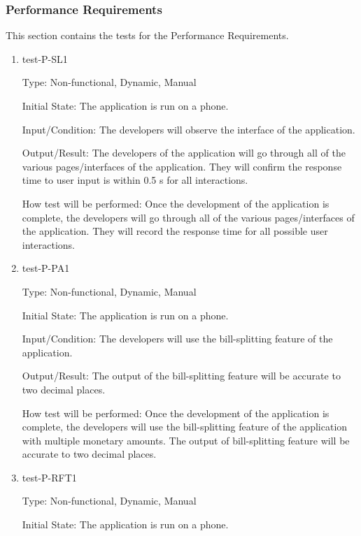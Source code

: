 \documentclass[12pt, titlepage]{article}
\begin{document}
\subsubsection{Performance Requirements}

This section contains the tests for the Performance Requirements.
		
\begin{enumerate}

\item{test-P-SL1\\}

Type: Non-functional, Dynamic, Manual 
					
Initial State: The application is run on a phone.
					
Input/Condition: The developers will observe the interface of the application. 
					
Output/Result: The developers of the application will go through all of the various pages/interfaces of the application. They will confirm the response time to user input is within 0.5 s for all interactions.
					
How test will be performed: Once the development of the application is complete, the developers will go through all of the various pages/interfaces of the application. They will record the response time for all possible user interactions.

\item{test-P-PA1\\}

Type: Non-functional, Dynamic, Manual 
					
Initial State: The application is run on a phone.
					
Input/Condition: The developers will use the bill-splitting feature of the application. 
					
Output/Result: The output of the bill-splitting feature will be accurate to two decimal places.
					
How test will be performed: Once the development of the application is complete, the developers will use the bill-splitting feature of the application with multiple monetary amounts. The output of bill-splitting feature will be accurate to two decimal places.

\item{test-P-RFT1\\}

Type: Non-functional, Dynamic, Manual 
					
Initial State: The application is run on a phone.
					

\end{enumerate}
\end{document}
